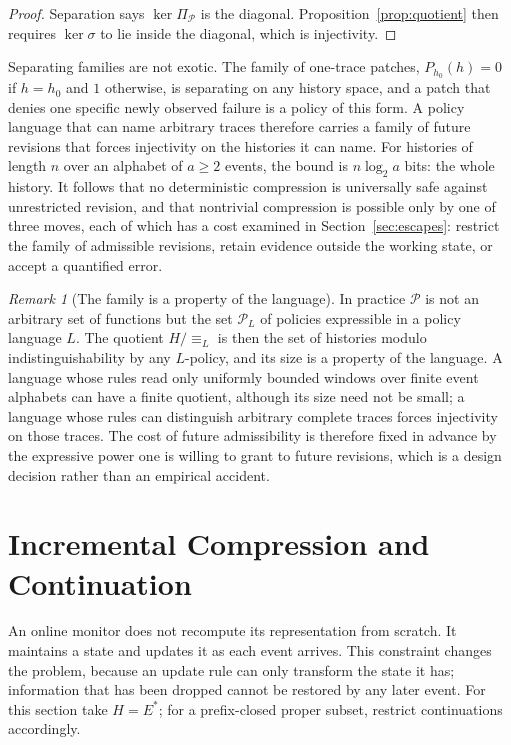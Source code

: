 \documentclass[11pt]{article}
\theoremstyle{definition}
\theoremstyle{remark}
\newtheorem{remark}{Remark}
\newcommand{\Ev}{E}
\newcommand{\Hist}{H}
\newcommand{\Pol}{\mathcal{P}}
\newcommand{\eqv}[1]{\equiv_{#1}}
\begin{document}
\begin{proof}
Separation says $\ker\Pi_\Pol$ is the diagonal. Proposition~\ref{prop:quotient} then requires $\ker\sigma$ to lie inside the diagonal, which is injectivity.
\end{proof}

Separating families are not exotic. The family of one-trace patches, $P_{h_0}(h)=0$ if $h=h_0$ and $1$ otherwise, is separating on any history space, and a patch that denies one specific newly observed failure is a policy of this form. A policy language that can name arbitrary traces therefore carries a family of future revisions that forces injectivity on the histories it can name. For histories of length $n$ over an alphabet of $a\ge2$ events, the bound is $n\log_2 a$ bits: the whole history. It follows that no deterministic compression is universally safe against unrestricted revision, and that nontrivial compression is possible only by one of three moves, each of which has a cost examined in Section~\ref{sec:escapes}: restrict the family of admissible revisions, retain evidence outside the working state, or accept a quantified error.

\begin{remark}[The family is a property of the language]
In practice $\Pol$ is not an arbitrary set of functions but the set $\Pol_L$ of policies expressible in a policy language $L$. The quotient $\Hist/{\eqv{L}}$ is then the set of histories modulo indistinguishability by any $L$-policy, and its size is a property of the language. A language whose rules read only uniformly bounded windows over finite event alphabets can have a finite quotient, although its size need not be small; a language whose rules can distinguish arbitrary complete traces forces injectivity on those traces. The cost of future admissibility is therefore fixed in advance by the expressive power one is willing to grant to future revisions, which is a design decision rather than an empirical accident.
\end{remark}

\section{Incremental Compression and Continuation}\label{sec:incremental}

An online monitor does not recompute its representation from scratch. It maintains a state and updates it as each event arrives. This constraint changes the problem, because an update rule can only transform the state it has; information that has been dropped cannot be restored by any later event. For this section take $\Hist=\Ev^{*}$; for a prefix-closed proper subset, restrict continuations accordingly.
\end{document}
